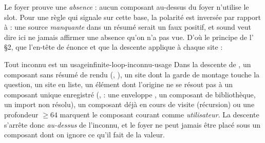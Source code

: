Le foyer prouve une \emph{absence} : \og aucun composant au-dessus du foyer n'utilise le slot\fg. Pour une règle qui signale sur cette base, la polarité est inversée par rapport à  : une source \emph{manquante} dans un résumé serait un faux positif, et \og sound\fg{} veut dire ici \og ne jamais affirmer une absence qu'on n'a pas vue\fg. D'où le principe de l' §2, que l'en-tête de  énonce et que la descente applique à chaque site :


\begin{invariant}{Tout inconnu est un usage}{infinite-loop-inconnu-usage}
Dans la descente de , un composant sans résumé de rendu (, ), un site dont la garde de montage touche la question, un site en liste, un élément dont l'origine ne se résout pas à un composant unique enregistré (,  : une enveloppe , un composant de bibliothèque, un import non résolu), un composant déjà en cours de visite (récursion) ou une profondeur $\geq 64$ marquent le composant courant comme \emph{utilisateur}. La descente s'arrête donc \emph{au-dessus} de l'inconnu, et le foyer ne peut jamais être placé sous un composant dont on ignore ce qu'il fait de la valeur.
\end{invariant}

